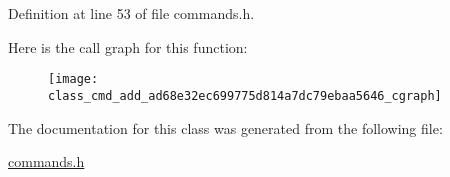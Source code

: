 Definition at line 53 of file commands.\+h.



Here is the call graph for this function\+:
\nopagebreak
\begin{figure}[H]
\begin{center}
\leavevmode
\texttt{[image: class\_cmd\_add\_ad68e32ec699775d814a7dc79ebaa5646\_cgraph]}
\end{center}
\end{figure}




The documentation for this class was generated from the following file\+:\begin{DoxyCompactItemize}
\item 
\hyperlink{commands_8h}{commands.\+h}\end{DoxyCompactItemize}
